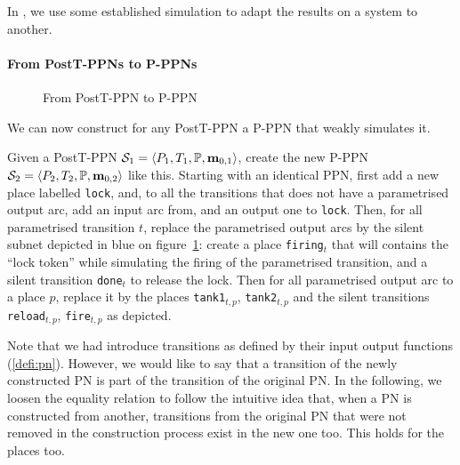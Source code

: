 In , we use some established simulation to adapt the results on a system to another.


\paragraph{From PostT-\acp{PPN} to P-\acp{PPN}}
\label{sec:from-postt-ppn-to-p-ppn}

\begin{figure}[htbp]
  \centering
  
  \par
  \caption{From PostT-\ac{PPN} to P-\ac{PPN}}
  \label{fig:posttppn-to-pppn}
\end{figure}

We can now construct for any PostT-\ac{PPN} a P-\ac{PPN} that weakly simulates it.

Given a PostT-\ac{PPN} $\namePPN[1] = \tuple{\places_1, \transitions_1, \parameters, \mar_{0,1}}$, create the new P-\ac{PPN} $\namePPN[2] = \tuple{\places_2, \transitions_2, \parameters, \mar_{0,2}}$ like this.
Starting with an identical \ac{PPN}, first add a new place labelled \texttt{lock}, and, to all the transitions that does not have a parametrised output arc, add an input arc from, and an output one to \texttt{lock}.
Then, for all parametrised transition $t$, replace the parametrised output arcs by the silent subnet depicted in blue on figure~\ref{fig:posttppn-to-pppn}:
create a place \texttt{firing}$_t$ that will contains the ``lock token'' while simulating the firing of the parametrised transition, and a silent transition \texttt{done}$_t$ to release the lock.
Then for all parametrised output arc to a place $p$, replace it by the places \texttt{tank1}$_{t,p}$, \texttt{tank2}$_{t,p}$ and the silent transitions \texttt{reload}$_{t,p}$, \texttt{fire}$_{t,p}$ as depicted.

\begin{technical-note}
Note that we had introduce transitions as defined by their input output functions (\cref{defi:pn}).
However, we would like to say that a transition of the newly constructed \ac{PN} is part of the transition of the original \ac{PN}.
In the following, we loosen the equality relation to follow the intuitive idea that, when a \ac{PN} is constructed from another, transitions from the original \ac{PN} that were not removed in the construction process exist in the new one too.
This holds for the places too.
\end{technical-note}

